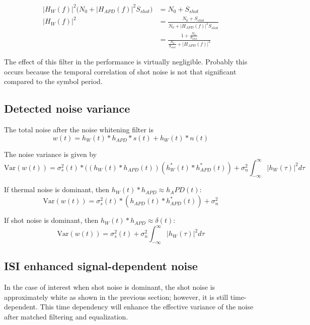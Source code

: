 \documentclass[a4paper]{article}
\begin{document}
\begin{align} \nonumber
|H_W(f)|^2\Big(N_0 + |H_{APD}(f)|^2S_{shot}\Big) &= N_0 + S_{shot} \\ \nonumber
|H_W(f)|^2 &= \frac{N_0 + S_{shot}}{N_0 + |H_{APD}(f)|^2S_{shot}} \\
 &= \frac{1 + \frac{N_0}{S_{shot}}}{\frac{N_0}{S_{shot}} + |H_{APD}(f)|^2}
\end{align}

The effect of this filter in the performance is virtually negligible. Probably this occurs because the temporal correlation of shot noise is not that significant compared to the symbol period.

\subsection{Detected noise variance}

The total noise after the noise whitening filter is
\begin{equation}
w(t) = h_W(t)\ast h_{APD} \ast s(t) + h_W(t)\ast n(t)
\end{equation}

The noise variance is given by
\begin{equation}
\text{Var}(w(t)) = \sigma_s^2(t)\ast \Big((h_W(t)\ast h_{APD}(t))(h_W^*(t)\ast h_{APD}^*(t)) + \sigma^2_n \int_{-\infty}^{\infty} |h_W(\tau)|^2 d\tau
\end{equation}

If thermal noise is dominant, then $h_W(t)\ast h_{APD} \approx h_APD(t)$:
\begin{equation}
\text{Var}(w(t)) = \sigma_s^2(t)\ast (h_{APD}(t) \ast h_{APD}^*(t)) + \sigma^2_n
\end{equation}

If shot noise is dominant, then $h_W(t)\ast h_{APD} \approx \delta(t)$:
\begin{equation}
\text{Var}(w(t)) = \sigma_s^2(t) + \sigma^2_n \int_{-\infty}^{\infty} |h_W(\tau)|^2 d\tau
\end{equation}

\subsection{ISI enhanced signal-dependent noise}

In the case of interest when shot noise is dominant, the shot noise is approximately white as shown in the previous section; however, it is still time-dependent. This time dependency will enhance the effective variance of the noise after matched filtering and equalization.
\end{document}
